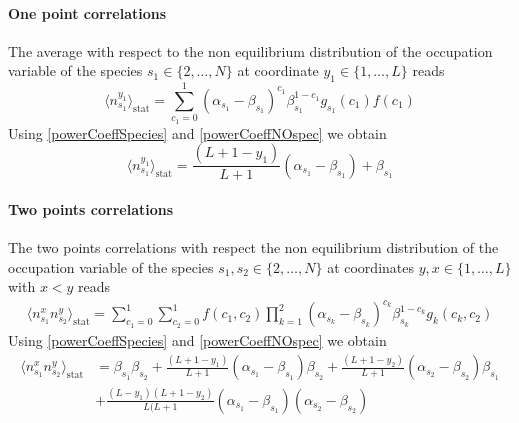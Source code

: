 \documentclass[11pt]{article}
\numberwithin{equation}{section}
\numberwithin{equation}{subsection}
\begin{document}
\paragraph{One point correlations}
The average with respect to the non equilibrium distribution of the occupation variable of the species $s_{1}\in \{2,\ldots,N\}$ at coordinate $y_{1}\in \{1,\ldots,L\}$ reads
\begin{equation}
	\langle n_{s_{1}}^{y_{1}}\rangle_{\text{stat}}=\sum_{c_{1}=0}^{1}(\alpha_{s_{1}}-\beta_{s_{1}})^{c_{1}}\beta_{s_{1}}^{1-c_{1}}g_{s_{1}}(c_{1})f(c_{1})
\end{equation}
Using \eqref{powerCoeffSpecies} and \eqref{powerCoeffNOspec} we obtain 
\begin{equation}\label{one-pts-corr}
\langle n_{s_{1}}^{y_{1}}\rangle_{\text{stat}}=\frac{(L+1-y_{1})}{L+1}(\alpha_{s_{1}}-\beta_{s_{1}})+\beta_{s_{1}}
\end{equation}
\paragraph{Two points correlations}
The two points correlations with respect the non equilibrium distribution of the occupation variable of the species $s_{1},s_{2}\in \{2,\ldots,N\}$ at coordinates $y,x\in \{1,\ldots,L\}$ with $x< y$ reads 
\begin{equation}
	\begin{split}
	\langle n_{s_{1}}^{x}n_{s_{2}}^{y}\rangle_{\text{stat}}= \sum_{c_{1}=0}^{1}\sum_{c_{2}=0}^{1}f(c_{1},c_{2})\prod_{k=1}^{2}(\alpha_{s_{k}}-\beta_{s_{k}})^{c_{k}}\beta_{s_{k}}^{1-c_{k}}g_{k}(c_{k},c_{2})
	\end{split}
\end{equation}
Using \eqref{powerCoeffSpecies} and \eqref{powerCoeffNOspec} we obtain 
\begin{equation}\label{two-pts-corr}
	\begin{split}
	\langle n_{s_{1}}^{x} n_{s_{2}}^{y}\rangle_{\text{stat}}&=\beta_{s_{1}}\beta_{s_{2}}+\frac{(L+1-y_{1})}{L+1}(\alpha_{s_{1}}-\beta_{s_{1}})\beta_{s_{2}}+\frac{(L+1-y_{2})}{L+1}(\alpha_{s_{2}}-\beta_{s_{2}})\beta_{s_{1}}\\&+\frac{(L-y_{1})(L+1-y_{2})}{L(L+1}(\alpha_{s_{1}}-\beta_{s_{1}})(\alpha_{s_{2}}-\beta_{s_{2}})
	\end{split}
\end{equation}
\end{document}
